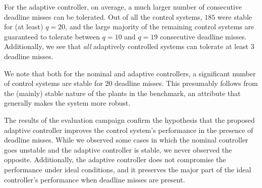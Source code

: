 For the adaptive controller, on average, a much larger number of consecutive deadline misses can be tolerated.
Out of all the control systems, $185$ were stable for (at least) $q=20$, and the large majority of the remaining control systems are guaranteed to tolerate between $q=10$ and $q=19$ consecutive deadline misses. Additionally, we see that \emph{all} adaptively controlled systems can tolerate at least $3$ deadline misses.

We note that both for the nominal and adaptive controllers, a significant number of control systems are stable for $20$ deadline misses.
This presumably follows from the (mainly) stable nature of the plants in the benchmark, an attribute that generally makes the system more robust.

The results of the evaluation campaign confirm the hypothesis that the proposed adaptive controller improves the control system's performance in the presence of deadline misses.
While we observed some cases in which the nominal controller goes unstable and the adaptive controller is stable, we never observed the opposite.
Additionally, the adaptive controller does not compromise the performance under ideal conditions, and it preserves the major part of the ideal controller's performance when deadline misses are present.
